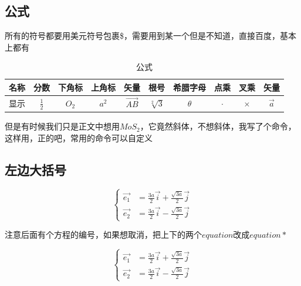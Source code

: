 \documentclass{LZUThesis}
\begin{document}
\subsection{公式} %
\label{sub:公式}
所有的符号都要用美元符号包裹\$，需要用到某一个但是不知道，直接百度，基本上都有
\begin{table}[H]
    \centering
    \caption{公式}
    \begin{tabular}{cccccccccc} %
    \toprule
    名称& 分数 & 下角标 & 上角标  & 矢量 & 根号 & 希腊字母 & 点乘 & 叉乘 & 矢量\\
    \midrule
    显示 & $\frac{1}{2}$ & $O_2$  & $a^2$ & $\vec{AB}$ & $\sqrt[2]{3}$ & $\theta$ & $\cdot$ & $\times$& $\vec{a}$\\
   
    \bottomrule
    \end{tabular}
    \label{tbl_gs}
\end{table}

但是有时候我们只是正文中想用$MoS_2$，它竟然斜体，不想斜体，我写了个命令，这样用，正的吧，常用的命令可以自定义


\subsection{左边大括号} %
\label{sub:左边大括号}

\begin{equation}
    \left\{
    \begin{array}{rcl}
        \vec{e_1} &= \frac{3a}{2} \vec{i} + \frac{\sqrt{3a}}{2} \vec{j} \\
        \vec{e_2} &= \frac{3a}{2} \vec{i} - \frac{\sqrt{3a}}{2} \vec{j}
    \end{array}
    \right.
    \label{e1e2}
\end{equation}

注意后面有个方程的编号，如果想取消，把上下的两个$equation$改成$equation*$

\begin{equation*}
    \left\{
    \begin{array}{rcl}
        \vec{e_1} &= \frac{3a}{2} \vec{i} + \frac{\sqrt{3a}}{2} \vec{j} \\
        \vec{e_2} &= \frac{3a}{2} \vec{i} - \frac{\sqrt{3a}}{2} \vec{j}
    \end{array}
    \right.
    \label{e1e2_2}
\end{equation*}
\end{document}
